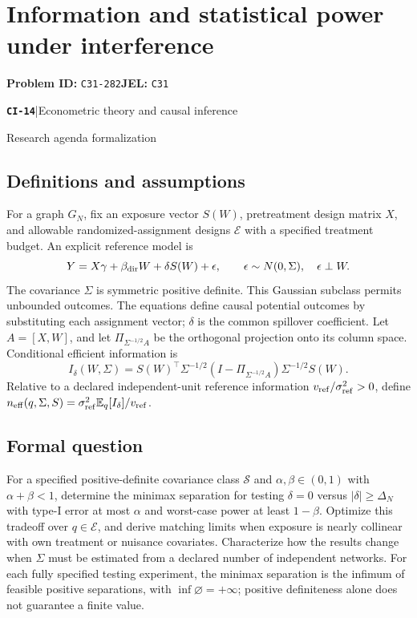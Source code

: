 \documentclass[11pt,a4paper]{article}
\newcommand{\E}{\mathbb E}
\newcommand{\entrymeta}[3]{{\sffamily\small\color{muted}\textbf{\texttt{#1}}\quad|\quad #2\par #3\par}}
\begin{document}
\section*{Information and statistical power under interference}
\textbf{Problem ID:} \texttt{C31-282}\quad \textbf{JEL:} \texttt{C31}\par
\label{problem:OP-0493}
\label{beyond:CI-14}
\entrymeta{CI-14}{Econometric theory and causal inference}{Research agenda formalization}
\subsection*{Definitions and assumptions}
For a graph $G_N$, fix an exposure vector $S(W)$, pretreatment design matrix $X$, and allowable randomized-assignment designs $\mathcal E$ with a specified treatment budget. An explicit reference model is
\[
Y=X\gamma+\beta_{\rm dir}W+\delta S(W)+\epsilon,\qquad
\epsilon\sim N(0,\Sigma),\quad \epsilon\perp W.
\]
The covariance $\Sigma$ is symmetric positive definite. This Gaussian subclass permits unbounded outcomes. The equations define causal potential outcomes by substituting each assignment vector; $\delta$ is the common spillover coefficient. Let $A=[X,W]$, and let $\Pi_{\Sigma^{-1/2}A}$ be the orthogonal projection onto its column space. Conditional efficient information is
\[
I_\delta(W,\Sigma)=
S(W)^\top\Sigma^{-1/2}
(I-\Pi_{\Sigma^{-1/2}A})\Sigma^{-1/2}S(W).
\]
Relative to a declared independent-unit reference information $v_{\rm ref}/\sigma_{\rm ref}^2>0$, define
$n_{\rm eff}(q,\Sigma,S)=\sigma_{\rm ref}^2\E_q[I_\delta]/v_{\rm ref}$.
\subsection*{Formal question}
For a specified positive-definite covariance class $\mathcal S$ and $\alpha,\beta\in(0,1)$ with $\alpha+\beta<1$, determine the minimax separation for testing $\delta=0$ versus $|\delta|\geq\Delta_N$ with type-I error at most $\alpha$ and worst-case power at least $1-\beta$. Optimize this tradeoff over $q\in\mathcal E$, and derive matching limits when exposure is nearly collinear with own treatment or nuisance covariates. Characterize how the results change when $\Sigma$ must be estimated from a declared number of independent networks. For each fully specified testing experiment, the minimax separation is the infimum of feasible positive separations, with $\inf\varnothing=+\infty$; positive definiteness alone does not guarantee a finite value.
\end{document}
